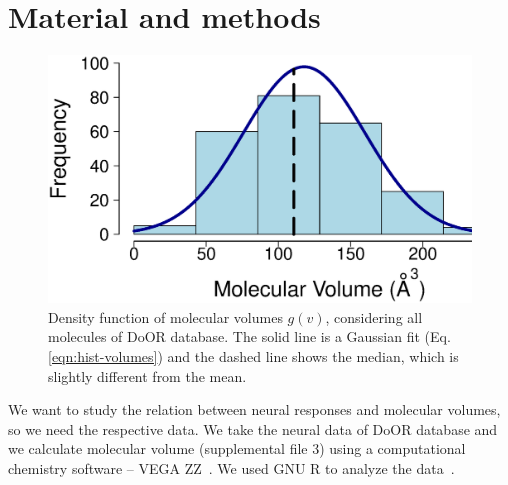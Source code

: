 \documentclass[11pt]{article} %
\begin{document}

 
 

\section*{Material and methods}
\begin{figure}
	\centering
	\includegraphics[width=0.5 \textwidth]{fig/hist-volumes}
	\caption{Density function of molecular volumes $g(v)$, considering all molecules of DoOR database. 
		The solid line is a Gaussian fit (Eq. \ref{eqn:hist-volumes}) and the dashed line shows the median, 
		which is slightly different from  the mean.}
	\label{fig:hist-volumes}
\end{figure}

We want to study the relation between neural responses and molecular volumes, 
so we need the respective data. 
We take the neural data of DoOR database \cite{Galizia2010} and we calculate molecular volume (supplemental file 3) using a computational chemistry software -- VEGA ZZ~\cite{Pedretti2004}. 
We used  GNU R to analyze the data~\cite{Rlanguage}.
\end{document}
